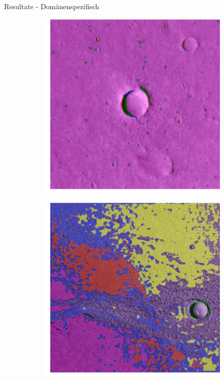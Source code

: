 \documentclass{beamer}
\begin{document}
\begin{frame}[allowframebreaks]{Resultate - Domänenspezifisch}
	\begin{figure}[h!]
		\begin{subfigure}{0.38\textwidth}
			\includegraphics[width=\linewidth,keepaspectratio]{gfx/p03_01.png_3.png}
		\end{subfigure}
		\begin{subfigure}{0.38\textwidth}
			\includegraphics[width=\linewidth,keepaspectratio]{gfx/p03_02.png_3.png}

\end{subfigure}
\end{figure}
\end{frame}
\end{document}
